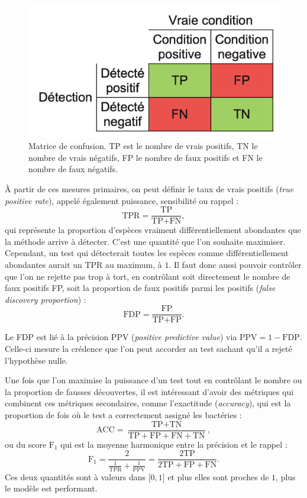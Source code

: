 \documentclass[12pt,a4paper]{reedthesis}
\theoremstyle{definition}
\theoremstyle{definition}
\theoremstyle{definition}
\theoremstyle{remark}
\begin{document}
\begin{figure}

{\centering \includegraphics[width=0.7\linewidth]{img/confusionmatrix} 

}

\caption{Matrice de confusion. TP est le nombre de vrais positifs, TN le nombre de vrais négatifs, FP le nombre de faux positifs et FN le nombre de faux négatifs.}\label{fig:conf}
\end{figure}
À partir de ces mesures primaires, on peut définir le taux de vrais positifs (\emph{true positive rate}), appelé également puissance, sensibilité ou rappel :
\begin{equation*}
\text{TPR} = \frac{\text{TP}}{\text{TP} + \text{FN}},
\end{equation*}
qui représente la proportion d'espèces vraiment différentiellement abondantes que la méthode arrive à détecter. C'est une quantité que l'on souhaite maximiser. Cependant, un test qui détecterait toutes les espèces comme différentiellement abondantes aurait un TPR au maximum, à \(1\). Il faut donc aussi pouvoir contrôler que l'on ne rejette pas trop à tort, en contrôlant soit directement le nombre de faux positifs FP, soit la proportion de faux positifs parmi les positifs (\emph{false discovery proportion}) :
\begin{equation*}
\text{FDP} = \frac{\text{FP}}{\text{TP} + \text{FP}}.
\end{equation*}
\newline

Le FDP est lié à la précision \(\text{PPV}\) (\emph{positive predictive value}) via \(\text{PPV} = 1 - \text{FDP}\). Celle-ci mesure la crédence que l'on peut accorder au test sachant qu'il a rejeté l'hypothèse nulle.

Une fois que l'on maximise la puissance d'un test tout en contrôlant le nombre ou la proportion de fausses découvertes, il est intéressant d'avoir des métriques qui combinent ces métriques secondaires, comme l'exactitude (\emph{accuracy}), qui est la proportion de fois où le test a correctement assigné les bactéries :
\begin{equation*}
\text{ACC} =\frac{\text{TP} + \text{TN}}{\text{TP} + \text{FP} + \text{FN} + \text{TN}},
\end{equation*}
ou du score \(\text{F}_1\) qui est la moyenne harmonique entre la précision et le rappel :
\begin{equation*}
\text{F}_1 = \frac{2}{\frac{1}{\text{TPR}} + \frac{1}{\text{PPV}}} = \frac{2 \text{TP}}{2\text{TP} + \text{FP} + \text{FN}}.
\end{equation*}
Ces deux quantités sont à valeurs dans \(\mathopen[0,1\mathclose]\) et plus elles sont proches de \(1\), plus le modèle est performant.
\end{document}
